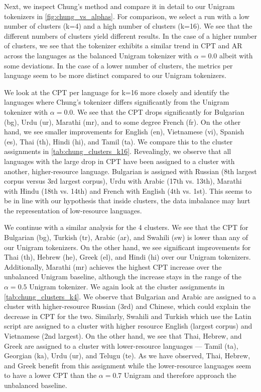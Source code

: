 Next, we inspect Chung's method and compare it in detail to our Unigram tokenizers in \autoref{fig:chung_vs_alphas}. For comparison, we select a run with a low number of clusters (k=4) and a high number of clusters (k=16). We see that the different numbers of clusters yield different results. In the case of a higher number of clusters, we see that the tokenizer exhibits a similar trend in CPT and AR across the languages as the balanced Unigram tokenizer with $\alpha=0.0$ albeit with some deviations. In the case of a lower number of clusters, the metrics per language seem to be more distinct compared to our Unigram tokenizers. 

We look at the CPT per language for k=16 more closely and identify the languages where Chung's tokenizer differs significantly from the Unigram tokenizer with $\alpha=0.0$. We see that the CPT drops significantly for Bulgarian (bg), Urdu (ur), Marathi (mr), and to some degree French (fr). On the other hand, we see smaller improvements for English (en), Vietnamese (vi), Spanish (es), Thai (th), Hindi (hi), and Tamil (ta). We compare this to the cluster assignments in \autoref{tab:chung_clusters_k16}. Revealingly, we observe that all languages with the large drop in CPT have been assigned to a cluster with another, higher-resource language. Bulgarian is assigned with Russian (8th largest corpus versus 3rd largest corpus), Urdu with Arabic (17th vs. 13th), Marathi with Hindu (18th vs. 14th) and French with English (4th vs. 1st). This seems to be in line with our hypothesis that inside clusters, the data imbalance may hurt the representation of low-resource languages.

We continue with a similar analysis for the 4 clusters. We see that the CPT for Bulgarian (bg), Turkish (tr), Arabic (ar), and Swahili (sw) is lower than any of our Unigram tokenizers. On the other hand, we see significant improvements for Thai (th), Hebrew (he), Greek (el), and Hindi (hi) over our Unigram tokenizers. Additionally, Marathi (mr) achieves the highest CPT increase over the unbalanced Unigram baseline, although the increase stays in the range of the $\alpha=0.5$ Unigram tokenizer. We again look at the cluster assignments in \autoref{tab:chung_clusters_k4}. We observe that Bulgarian and Arabic are assigned to a cluster with higher-resource Russian (3rd) and Chinese, which could explain the decrease in CPT for the two. Similarly, Swahili and Turkish which use the Latin script are assigned to a cluster with higher resource English (largest corpus) and Vietnamese (2nd largest). On the other hand, we see that Thai, Hebrew, and Greek are assigned to a cluster with lower-resource languages --- Tamil (ta), Georgian (ka), Urdu (ur), and Telugu (te). As we have observed, Thai, Hebrew, and Greek benefit from this assignment while the lower-resource languages seem to have a lower CPT than the $\alpha=0.7$ Unigram and therefore approach the unbalanced baseline.

